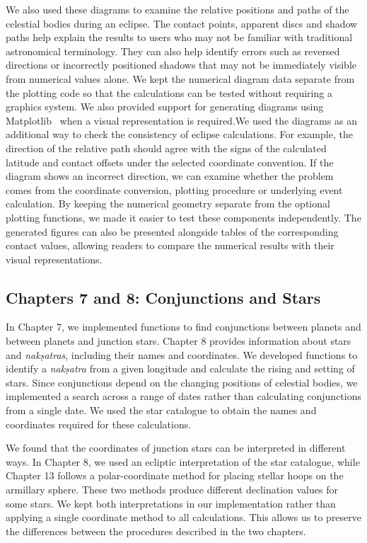 \documentclass[12pt,a4paper,oneside]{report}
\begin{document}
We also used these diagrams to examine the relative positions and paths of the celestial bodies during an eclipse. The contact points, apparent discs and shadow paths help explain the results to users who may not be familiar with traditional astronomical terminology. They can also help identify errors such as reversed directions or incorrectly positioned shadows that may not be immediately visible from numerical values alone. We kept the numerical diagram data separate from the plotting code so that the calculations can be tested without requiring a graphics system. We also provided support for generating diagrams using Matplotlib~\cite{hunter2007} when a visual representation is required.We used the diagrams as an additional way to check the consistency of eclipse calculations. For example, the direction of the relative path should agree with the signs of the calculated latitude and contact offsets under the selected coordinate convention. If the diagram shows an incorrect direction, we can examine whether the problem comes from the coordinate conversion, plotting procedure or underlying event calculation. By keeping the numerical geometry separate from the optional plotting functions, we made it easier to test these components independently. The generated figures can also be presented alongside tables of the corresponding contact values, allowing readers to compare the numerical results with their visual representations.

\subsection{Chapters 7 and 8: Conjunctions and Stars}

In Chapter 7, we implemented functions to find conjunctions between planets and between planets and junction stars. Chapter 8 provides information about stars and \emph{nakṣatras}, including their names and coordinates. We developed functions to identify a \emph{nakṣatra} from a given longitude and calculate the rising and setting of stars. Since conjunctions depend on the changing positions of celestial bodies, we implemented a search across a range of dates rather than calculating conjunctions from a single date. We used the star catalogue to obtain the names and coordinates required for these calculations.

We found that the coordinates of junction stars can be interpreted in different ways. In Chapter 8, we used an ecliptic interpretation of the star catalogue, while Chapter 13 follows a polar-coordinate method for placing stellar hoops on the armillary sphere. These two methods produce different declination values for some stars. We kept both interpretations in our implementation rather than applying a single coordinate method to all calculations. This allows us to preserve the differences between the procedures described in the two chapters.
\end{document}
